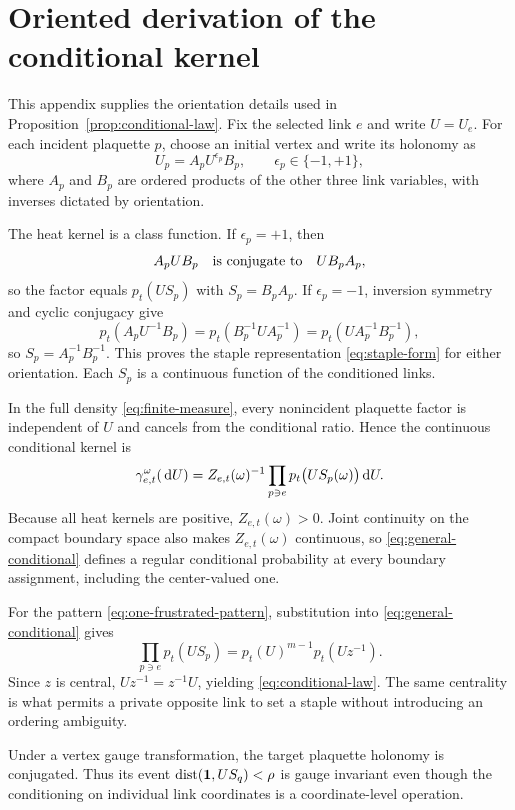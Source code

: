 \section{Oriented derivation of the conditional kernel}
\label{app:conditional-kernel}

This appendix supplies the orientation details used in
Proposition~\ref{prop:conditional-law}.  Fix the selected link $e$ and write
$U=U_e$.  For each incident plaquette $p$, choose an initial vertex and
write its holonomy as
\begin{equation}\label{eq:oriented-plaquette}
  U_p=A_pU^{\epsilon_p}B_p,
  \qquad \epsilon_p\in\{-1,+1\},
\end{equation}
where $A_p$ and $B_p$ are ordered products of the other three link variables,
with inverses dictated by orientation.

The heat kernel is a class function.  If $\epsilon_p=+1$, then
\[
  A_pUB_p \quad\hbox{is conjugate to}\quad U B_pA_p,
\]
so the factor equals $p_t(US_p)$ with $S_p=B_pA_p$.  If
$\epsilon_p=-1$, inversion symmetry and cyclic conjugacy give
\[
 p_t(A_pU^{-1}B_p)
 =p_t(B_p^{-1}UA_p^{-1})
 =p_t(UA_p^{-1}B_p^{-1}),
\]
so $S_p=A_p^{-1}B_p^{-1}$.  This proves the staple representation
\eqref{eq:staple-form} for either orientation.  Each $S_p$ is a continuous
function of the conditioned links.

In the full density \eqref{eq:finite-measure}, every nonincident plaquette
factor is independent of $U$ and cancels from the conditional ratio.  Hence
the continuous conditional kernel is
\begin{equation}\label{eq:general-conditional}
 \gamma_{e,t}^{\omega}(\,\mathrm d U)
 =Z_{e,t}(\omega)^{-1}
 \prod_{p\ni e}p_t\bigl(U S_p(\omega)\bigr)\,\mathrm dU.
\end{equation}
Because all heat kernels are positive, $Z_{e,t}(\omega)>0$.  Joint
continuity on the compact boundary space also makes
$Z_{e,t}(\omega)$ continuous, so \eqref{eq:general-conditional} defines a
regular conditional probability at every boundary assignment, including
the center-valued one.

For the pattern \eqref{eq:one-frustrated-pattern}, substitution into
\eqref{eq:general-conditional} gives
\[
 \prod_{p\ni e}p_t(US_p)=p_t(U)^{m-1}p_t(Uz^{-1}).
\]
Since $z$ is central, $Uz^{-1}=z^{-1}U$, yielding
\eqref{eq:conditional-law}.  The same centrality is what permits a private
opposite link to set a staple without introducing an ordering ambiguity.

Under a vertex gauge transformation, the target plaquette holonomy is
conjugated.  Thus its event
$\operatorname{dist}(\mathbf 1,U S_q)<\rho$ is gauge invariant even though the conditioning on
individual link coordinates is a coordinate-level operation.
